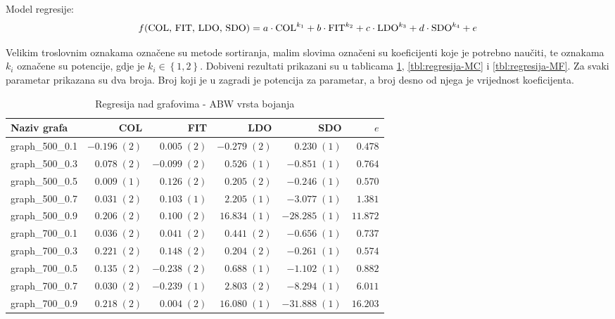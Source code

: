 \documentclass[times, utf8, diplomski, numeric]{fer}
\begin{document}
Model regresije:
\begin{equation}
	f(\textup{COL, FIT, LDO, SDO}) = a\cdot \textup{COL}^{k_1} + b\cdot \textup{FIT}^{k_2} + c\cdot \textup{LDO}^{k_3} + d\cdot \textup{SDO}^{k_4} + e
\end{equation}

Velikim troslovnim oznakama označene su metode sortiranja, malim slovima označeni su koeficijenti koje je potrebno naučiti, te oznakama $k_i$ označene su potencije, gdje je $k_i \in \left \{ 1, 2 \right \} $.
Dobiveni rezultati prikazani su u tablicama \ref{tbl:regresija-ABW}, \ref{tbl:regresija-MC} i \ref{tbl:regresija-MF}. Za svaki parametar prikazana su dva broja. Broj koji je u zagradi je potencija za parametar, a broj desno od njega je vrijednost koeficijenta.


\begin{table}[htb]
	\caption{Regresija nad grafovima - ABW vrsta bojanja}
	\label{tbl:regresija-ABW}
	\centering
	\begin{tabular}{|l|r|r|r|r|r|} \hline
	Naziv grafa & COL & FIT & LDO & SDO & $e$ \\ \hline \hline
graph\_500\_0.1 & $ -0.196\; (2) $ & $ 0.005\; (2) $ & $ -0.279\; (2) $ & $ 0.230\; (1) $ & $ 0.478 $\\ \hline
graph\_500\_0.3 & $ 0.078\; (2) $ & $ -0.099\; (2) $ & $ 0.526\; (1) $ & $ -0.851\; (1) $ & $ 0.764 $\\ \hline
graph\_500\_0.5 & $ 0.009\; (1) $ & $ 0.126\; (2) $ & $ 0.205\; (2) $ & $ -0.246\; (1) $ & $ 0.570 $\\ \hline
graph\_500\_0.7 & $ 0.031\; (2) $ & $ 0.103\; (1) $ & $ 2.205\; (1) $ & $ -3.077\; (1) $ & $ 1.381 $\\ \hline
graph\_500\_0.9 & $ 0.206\; (2) $ & $ 0.100\; (2) $ & $ 16.834\; (1) $ & $ -28.285\; (1) $ & $ 11.872 $\\ \hline
graph\_700\_0.1 & $ 0.036\; (2) $ & $ 0.041\; (2) $ & $ 0.441\; (2) $ & $ -0.656\; (1) $ & $ 0.737 $\\ \hline
graph\_700\_0.3 & $ 0.221\; (2) $ & $ 0.148\; (2) $ & $ 0.204\; (2) $ & $ -0.261\; (1) $ & $ 0.574 $\\ \hline
graph\_700\_0.5 & $ 0.135\; (2) $ & $ -0.238\; (2) $ & $ 0.688\; (1) $ & $ -1.102\; (1) $ & $ 0.882 $\\ \hline
graph\_700\_0.7 & $ 0.030\; (2) $ & $ -0.239\; (1) $ & $ 2.803\; (2) $ & $ -8.294\; (1) $ & $ 6.011 $\\ \hline
graph\_700\_0.9 & $ 0.218\; (2) $ & $ 0.004\; (2) $ & $ 16.080\; (1) $ & $ -31.888\; (1) $ & $ 16.203 $\\ \hline

\end{tabular}
\end{table}
\end{document}
